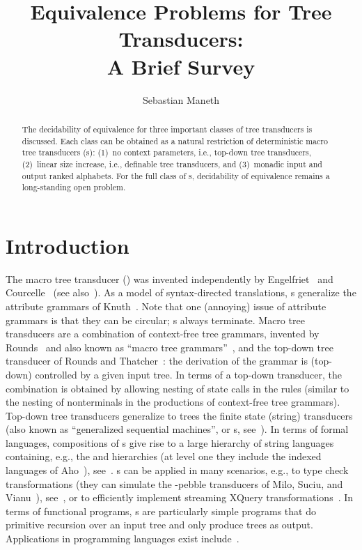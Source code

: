 \documentclass[copyright,creativecommons]{eptcs}
\title{Equivalence Problems for Tree Transducers:\\A Brief Survey}
\author{Sebastian Maneth
\institute{School of Informatics\\University of Edinburgh}
\email{smaneth@inf.ed.ac.uk}
}
\begin{document}
\maketitle
\begin{abstract}
The decidability of equivalence for three important classes of tree transducers is discussed. 
Each class can be obtained as a natural restriction of deterministic macro tree transducers (s):
(1)~no context parameters, i.e., top-down tree transducers,
(2)~linear size increase, i.e.,  definable tree transducers, and
(3)~monadic input and output ranked alphabets.
For the full class of s, decidability of equivalence remains a long-standing open problem.
\end{abstract}
\section{Introduction}

The macro tree transducer () was invented independently by
Engelfriet~\cite{eng80,DBLP:journals/jcss/EngelfrietV85}
and Courcelle~\cite{DBLP:journals/tcs/CourcelleF82,DBLP:journals/tcs/CourcelleF82a} 
(see also~\cite{DBLP:series/eatcs/FulopV98}).
As a model of syntax-directed translations, s generalize the
attribute grammars of Knuth~\cite{DBLP:journals/mst/Knuth68}. 
Note that one (annoying) issue of attribute
grammars is that they can be circular; s always terminate.
Macro tree transducers are a combination of context-free
tree grammars, invented by Rounds~\cite{DBLP:conf/stoc/Rounds69} and 
also known as ``macro tree grammars''~\cite{fis68}, and 
the top-down tree transducer of Rounds and 
Thatcher~\cite{DBLP:journals/mst/Rounds70,DBLP:journals/jcss/Thatcher70}:
the derivation of the grammar is (top-down) controlled by a given
input tree. In terms of a top-down transducer, the combination is
obtained by allowing nesting of state calls in the rules
(similar to the nesting of nonterminals in the productions of context-free tree grammars).
Top-down tree transducers generalize to trees the
finite state (string) transducers (also known as ``generalized sequential machines'', 
or s, 
see~\cite{gin66,Berstel79transductionsand}).
In terms of formal languages, compositions of s
give rise to
 a large hierarchy of string languages containing, e.g., the  and  hierarchies
(at level one they include the indexed languages of Aho~\cite{DBLP:journals/jacm/Aho68}),
see~\cite{DBLP:journals/jcss/EngelfrietM02}.
s can be applied in many scenarios, e.g., to type check
 transformations 
(they can simulate the -pebble transducers of Milo, Suciu, and Vianu~\cite{DBLP:journals/jcss/MiloSV03}),
see~\cite{DBLP:journals/acta/EngelfrietM03,DBLP:conf/pods/ManethBPS05,DBLP:conf/icdt/ManethPS07}, or
to efficiently implement streaming XQuery transformations~\cite{icde2014,DBLP:conf/aplas/NakanoM06}.
In terms of functional programs, s are particularly simple
programs that do primitive recursion over an input tree and 
only produce trees as output. Applications in programming 
languages exist 
include~\cite{DBLP:journals/scp/Vogler91,DBLP:phd/de/Voigtlander2005,DBLP:conf/aplas/NakanoM06}.
\end{document}
